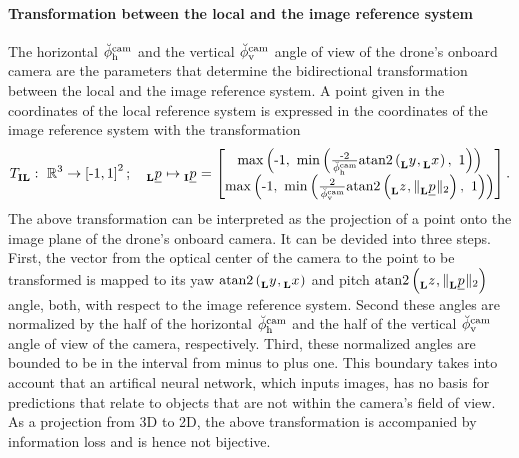 \paragraph*{Transformation between the local and the image reference system} $\ $\\
The horizontal
$\ang[\user]{\camera}{\text h}{}{}$
and the vertical
$\ang[\user]{\camera}{\text v}{}{}$
angle of view
of the drone's onboard camera
are the parameters 
that determine the bidirectional transformation 
between the local and the image reference system.
A point given in the coordinates of the local reference system
is expressed in the coordinates of the image reference system with the transformation
\begin{align} \label{equ:local_to_image_transformation}
    \trafo[]{}{\irs\lrs}{}{}
    :\ 
    \mathbb{R}^3 \rightarrow \left[ \text{-}1, 1 \right]^2
    ; \quad
    \pos[]{}{}{\lrs}{} \mapsto \pos[]{}{}{\irs}{}
    =
    \begin{bmatrix}
        \maxof{\text -1}{
            \minof{
                \frac{\text -2}{\ang[\user]{\camera}{\text h}{}{}}
                \mathrm{atan2}\left( \y[]{}{}{\lrs}{}, \x[]{}{}{\lrs}{} \right)
            }{1}
        }
        \\
        \maxof{\text -1}{
            \minof{
                \frac{2}{\ang[\user]{\camera}{\text v}{}{}}
            \mathrm{atan2} \left( \z[]{}{}{\lrs}{}, \| \pos[]{}{}{\lrs}{} \|_2 \right)
            }{1}
        }
    \end{bmatrix}
    .
\end{align}
The above transformation
can be interpreted as the projection of a point onto the image plane 
of the drone's onboard camera.
It can be devided into three steps.
First, the vector from the optical center of the camera 
to the point to be transformed
is mapped to its yaw
$\mathrm{atan2}\left( \y[]{}{}{\lrs}{}, \x[]{}{}{\lrs}{} \right)$
and pitch 
$\mathrm{atan2} \left( \z[]{}{}{\lrs}{}, \| \pos[]{}{}{\lrs}{} \|_2 \right)$
angle, both, with respect to the image reference system.
Second these angles are normalized by 
the half of the horizontal 
$\ang[\user]{\camera}{\text h}{}{}$ 
and the half of the vertical
$\ang[\user]{\camera}{\text v}{}{}$
angle of view of the camera, respectively.
Third, these normalized angles are bounded to be in the interval from minus to plus one.
This boundary takes into account 
that an artifical neural network, which inputs images, 
has no basis for predictions 
that relate to objects that are not within the camera's field of view.
As a projection from 3D to 2D, the above transformation is accompanied by information loss
and is hence not bijective.

